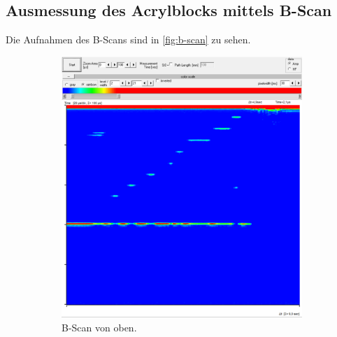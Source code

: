 \subsection{Ausmessung des Acrylblocks mittels B-Scan} \label{sec:b-scan}

Die Aufnahmen des B-Scans sind in \autoref{fig:b-scan} zu sehen.
\begin{figure}
  \centering
  
  \begin{subfigure}{0.49\columnwidth}
  \centering
  \includegraphics[width=\textwidth]{pictures/bo.png}
  \caption{B-Scan von oben.}
  \label{fig:bo}
  \end{subfigure}
  \hfill
  \begin{subfigure}{0.49\columnwidth}
  \centering

\end{subfigure}
\end{figure}
